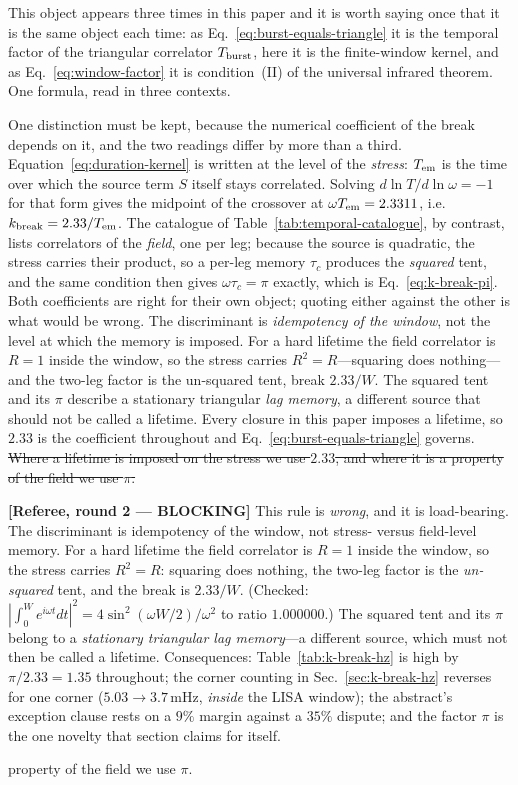 \documentclass[10pt,prd,aps,nobibnotes,superscriptaddress,preprintnumbers,notitlepage]{revtex4-1}
\newcommand{\revX}[1]{\par\noindent\begin{tcolorbox}[colback=red!5,colframe=red!70!black,
    boxrule=1pt,left=3pt,right=3pt,top=2pt,bottom=2pt,breakable]
    \footnotesize\textcolor{red!70!black}{\textbf{[Referee, round 2 --- BLOCKING]} #1}\end{tcolorbox}\par}
\newcommand{\add}[1]{{\color{red}#1}}
\newcommand{\del}[1]{{\color{red}\sout{#1}}}
\newcommand{\add}[1]{#1}
\newcommand{\del}[1]{}
\begin{document}
\add{This object appears three times in this paper and it is worth saying once that it is
the same object each time: as Eq.~\eqref{eq:burst-equals-triangle} it is the temporal
factor of the triangular correlator $T_{\rm burst}$, here it is the finite-window
kernel, and as Eq.~\eqref{eq:window-factor} it is condition~(II) of the universal
infrared theorem. One formula, read in three contexts.

One distinction must be kept, because the numerical coefficient of the break depends on
it, and the two readings differ by more than a third. Equation~\eqref{eq:duration-kernel}
is written at the level of the \emph{stress}: $T_{\rm em}$ is the time over which the
source term $S$ itself stays correlated. Solving
$d\ln T/d\ln\omega=-1$ for that form gives the midpoint of the crossover at
$\omega T_{\rm em}=2.3311$, i.e.\ $k_{\rm break}=2.33/T_{\rm em}$. The catalogue of
Table~\ref{tab:temporal-catalogue}, by contrast, lists correlators of the \emph{field},
one per leg; because the source is quadratic, the stress carries their product, so a
per-leg memory $\tau_c$ produces the \emph{squared} tent, and the same condition then
gives $\omega\tau_c=\pi$ exactly, which is Eq.~\eqref{eq:k-break-pi}. Both coefficients
are right for their own object; quoting either against the other is what would be
wrong. \add{The discriminant is \emph{idempotency of the window}, not the level at
which the memory is imposed. For a hard lifetime the field correlator is $R=1$ inside the
window, so the stress carries $R^{2}=R$---squaring does nothing---and the two-leg factor
is the un-squared tent, break $2.33/W$. The squared tent and its $\pi$ describe a
stationary triangular \emph{lag memory}, a different source that should not be called a
lifetime. Every closure in this paper imposes a lifetime, so $2.33$ is the coefficient
throughout and Eq.~\eqref{eq:burst-equals-triangle} governs.}
\del{Where a lifetime is imposed on the stress we use $2.33$, and where it is a property of the field we use $\pi$.}
\revX{This rule is \emph{wrong}, and it is load-bearing. The discriminant is
idempotency of the window, not stress- versus field-level memory. For a hard lifetime the
field correlator is $R=1$ inside the window, so the stress carries $R^{2}=R$: squaring
does nothing, the two-leg factor is the \emph{un-squared} tent, and the break is
$2.33/W$. (Checked: $|\int_0^W e^{i\omega t}dt|^{2}=4\sin^{2}(\omega W/2)/\omega^{2}$ to
ratio $1.000000$.) The squared tent and its $\pi$ belong to a \emph{stationary triangular
lag memory}---a different source, which must not then be called a lifetime. Consequences:
Table~\ref{tab:k-break-hz} is high by $\pi/2.33=1.35$ throughout; the corner counting in
Sec.~\ref{sec:k-break-hz} reverses for one corner ($5.03\to3.7\,$mHz, \emph{inside} the
LISA window); the abstract's exception clause rests on a $9\%$ margin against a $35\%$
dispute; and the factor $\pi$ is the one novelty that section claims for itself.}
property of the field we use $\pi$.}
\end{document}
